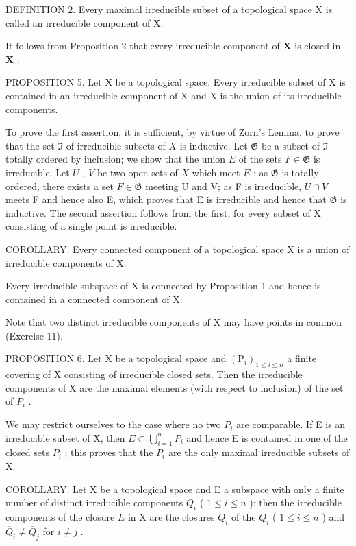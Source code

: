 DEFINITION 2. Every maximal irreducible subset of a topological space X is called an irreducible component of X.

It follows from Proposition 2 that every irreducible component of \(\mathbf{X}\) is closed in \(\mathbf{X}\) .

PROPOSITION 5. Let X be a topological space. Every irreducible subset of X is contained in an irreducible component of X and X is the union of its irreducible components.

To prove the first assertion, it is sufficient, by virtue of Zorn's Lemma, to prove that the set \(\Im\) of irreducible subsets of \(X\) is inductive. Let \(\mathfrak{G}\) be a subset of \(\Im\) totally ordered by inclusion; we show that the union \(E\) of the sets \(F \in \mathfrak{G}\) is irreducible. Let \(U\) , \(V\) be two open sets of \(X\) which meet \(E\) ; as \(\mathfrak{G}\) is totally ordered, there exists a set \(F \in \mathfrak{G}\) meeting U and V; as F is irreducible, \(U \cap V\) meets F and hence also E, which proves that E is irreducible and hence that \(\mathfrak{G}\) is inductive. The second assertion follows from the first, for every subset of X consisting of a single point is irreducible.

COROLLARY. Every connected component of a topological space X is a union of irreducible components of X.

Every irreducible subspace of X is connected by Proposition 1 and hence is contained in a connected component of X.

Note that two distinct irreducible components of X may have points in common (Exercise 11).

PROPOSITION 6. Let X be a topological space and \((\mathrm{P}_{i})_{1\leq i\leq n}\) a finite covering of X consisting of irreducible closed sets. Then the irreducible components of X are the maximal elements (with respect to inclusion) of the set of \(P_{i}\) .

We may restrict ourselves to the case where no two \(P_{i}\) are comparable. If E is an irreducible subset of X, then \(E \subset \bigcup_{i=1}^{n} P_{i}\) and hence E is contained in one of the closed sets \(P_{i}\) ; this proves that the \(P_{i}\) are the only maximal irreducible subsets of X.

COROLLARY. Let X be a topological space and E a subspace with only a finite number of distinct irreducible components \(Q_{i}\) ( \(1 \leqslant i \leqslant n\) ); then the irreducible components of the closure \(\overline{E}\) in X are the closures \(\overline{Q}_{i}\) of the \(Q_{i}\) ( \(1 \leqslant i \leqslant n\) ) and \(\overline{Q}_{i} \neq \overline{Q}_{j}\) for \(i \neq j\) .

